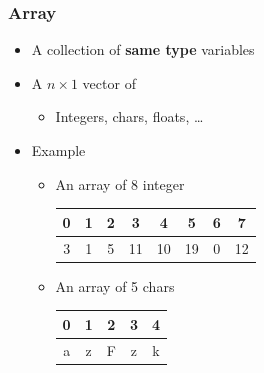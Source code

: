 \documentclass{../c-lecture}
\begin{document}
\begin{frame}
  \frametitle{Array}
  \begin{itemize}
    \item A collection of \textbf{\color{Peach}same type} variables
    \item A $n \times 1$ vector of
    \begin{itemize}
      \item Integers, chars, floats, \ldots
    \end{itemize}
    \item Example
    \begin{itemize}
      \item An array of 8 integer
      \begin{table}
      \begin{tabular}{*{8}{c}}
        \toprule

        0 &
        1 &
        2 &
        3 &
        4 &
        5 &
        6 &
        7 \\

        \midrule

        3 &
        1 &
        5 &
        11 &
        10 &
        19 &
        0 &
        12 \\

        \bottomrule
      \end{tabular}
      \end{table}
      \item An array of 5 chars
      \begin{table}
      \begin{tabular}{*{5}{c}}
        \toprule

        0 &
        1 &
        2 &
        3 &
        4 \\

        \midrule

        a &
        z &
        F &
        z &
        k \\

        \bottomrule
      \end{tabular}
      \end{table}
    \end{itemize}
  \end{itemize}
\end{frame}
\end{document}
